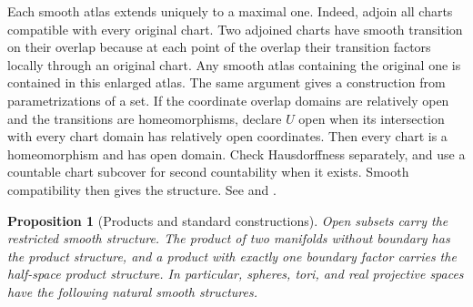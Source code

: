 \documentclass[11pt,oneside,openany]{book}
\newtheorem{proposition}[theorem]{Proposition}
\theoremstyle{definition}
\theoremstyle{remark}
\begin{document}
Each smooth atlas extends uniquely to a maximal one. Indeed, adjoin all
charts compatible with every original chart. Two adjoined charts have
smooth transition on their overlap because at each point of the overlap
their transition factors locally through an original chart. Any smooth
atlas containing the original one is contained in this enlarged atlas.
The same argument gives a construction from parametrizations of a set.
If the coordinate overlap domains are relatively open and the
transitions are homeomorphisms, declare \(U\) open when its intersection
with every chart domain has relatively open coordinates. Then every
chart is a homeomorphism and has open domain. Check Hausdorffness
separately, and use a countable chart subcover for second countability
when it exists. Smooth compatibility then gives the structure. See
\cite[Chapter~1]{lee} and \cite[Sections~5--6]{tu}.

\begin{proposition}[Products and standard constructions]\label{p104:M01.03}
Open subsets carry the restricted smooth structure. The product of two
manifolds without boundary has the product structure, and a product
with exactly one boundary factor carries the half-space product
structure. In particular, spheres, tori, and real projective spaces
have the following natural smooth structures.
\end{proposition}
\end{document}
